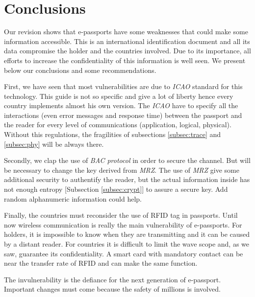 \documentclass{acm_proc_article-sp}
\begin{document}
\section{Conclusions}
\label{sec:sec4}
Our revision shows that e-passports have some weaknesses that could make some information accessible. This is an international identification document and all its data compromise the holder and the countries involved. Due to its importance, all efforts to increase the confidentiality of this information is well seen. We present below our conclusions and some recommendations.

First, we have seen that most vulnerabilities are due to \emph{ICAO} standard for this technology. This guide is not so specific and give a lot of liberty hence every country implements almost his own version. The \emph{ICAO} have to specify all the interactions (even error messages and response time)  between the passport and the reader for every level of communications (application, logical, physical). Without this regulations, the fragilities of subsections \ref{subsec:trace} and \ref{subsec:phy} will be always there.

Secondly, we clap the use of \emph{BAC protocol} in order to secure the channel. But will be necessary to change the key derived from \emph{MRZ}. The use of \emph{MRZ} give some additional security to authentify the reader, but the actual information inside has not enough entropy [Subsection \ref{subsec:crypt}] to assure a secure key. Add random alphanumeric information could help.

Finally, the countries must reconsider the use of RFID tag in passports. Until now wireless communication is really the main vulnerability of e-passports. For holders, it is impossible to know when they are transmitting and it can be caused by a distant reader. For countries it is difficult to limit the wave scope and, as we saw, guarantee its confidentiality. A smart card with mandatory contact can be near the transfer rate of RFID and can make the same function.

The invulnerability is the defiance for the next generation of e-passport. Important changes must come because the safety of millions is involved. 


%
%

\balancecolumns
\end{document}

